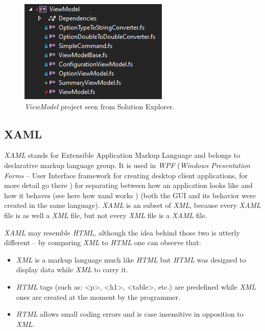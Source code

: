         \begin{figure}[H]
            \centering
            \includegraphics{img/viewmodel.png}
            \caption{\textit{ViewModel} project seen from Solution Explorer.}
            \label{fig:viewmodel}
        \end{figure} 
    
\subsection{XAML}
    \textit{XAML} stands for Extensible Application Markup Language and belongs to declarative markup language group. It is used in \textit{WPF} (\textit{Windows Presentation Forms} -- User Interface framework for creating desktop client applications, for more detail go there \cite{wpf}) for separating between how an application looks like and how it behaves (see here how xaml works \cite{how_xaml_works}) (both the GUI and its behavior were created in the same language). \textit{XAML} is an subset of \textit{XML}, because every \textit{XAML} file is as well a \textit{XML} file, but not every \textit{XML} file is a \textit{XAML} file.
    
    \textit{XAML} may resemble \textit{HTML}, although the idea behind those two is utterly different -- by comparing \textit{XML} to \textit{HTML} one can observe that:
    \begin{itemize}
        \item \textit{XML} is a markup language much like \textit{HTML} but \textit{HTML} was designed to display data while \textit{XML} to carry it.
        \item \textit{HTML} tags (such as: <p>, <h1>, <table>, etc.) are predefined while \textit{XML} ones are created at the moment by the programmer.
        \item \textit{HTML} allows small coding errors and is case insensitive in opposition to \textit{XML}.
    \end{itemize}
